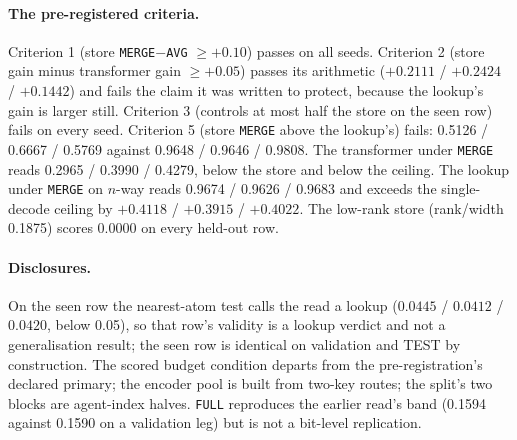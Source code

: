 \documentclass{article} %
\begin{document}
\paragraph{The pre-registered criteria.} Criterion 1 (store \texttt{MERGE}$-$\texttt{AVG} $\ge+0.10$) passes on all seeds.
Criterion 2 (store gain minus transformer gain $\ge+0.05$) passes its arithmetic ($+0.2111$ / $+0.2424$
/ $+0.1442$) and fails the claim it was written to protect, because the lookup's gain is larger
still. Criterion 3 (controls at most half the store on the seen row) fails on every seed. Criterion 5 (store
\texttt{MERGE} above the lookup's) fails: 0.5126 / 0.6667 / 0.5769 against 0.9648 / 0.9646 /
0.9808. The transformer under \texttt{MERGE} reads 0.2965 / 0.3990 / 0.4279, below the store and
below the ceiling. The lookup under \texttt{MERGE} on $n$-way reads 0.9674 / 0.9626 / 0.9683 and
exceeds the single-decode ceiling by $+0.4118$ / $+0.3915$ / $+0.4022$. The low-rank store
(rank/width 0.1875) scores 0.0000 on every held-out row. %

\paragraph{Disclosures.} On the seen row the nearest-atom test calls the read a lookup
($0.0445$ / $0.0412$ / $0.0420$, below 0.05), so that row's validity is a lookup verdict and not a
generalisation result; the seen row is identical on validation and TEST by construction. The
scored budget condition departs from the pre-registration's declared primary; the encoder pool is built
from two-key routes; the split's two blocks are agent-index halves. \texttt{FULL} reproduces the
earlier read's band (0.1594 against 0.1590 on a validation leg) but is not a bit-level
replication. %
\end{document}
